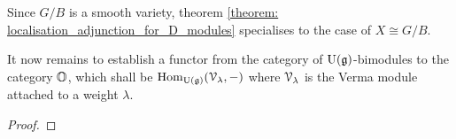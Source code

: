             \begin{corollary}
                Since $G/B$ is a smooth variety, theorem \ref{theorem: localisation_adjunction_for_D_modules} specialises to the case of $X \cong G/B$.
            \end{corollary}
            
            It now remains to establish a functor from the category of $\mathrm{U}(\mathfrak{g})$-bimodules to the category $\mathbb{O}$, which shall be $\mathrm{Hom}_{\mathrm{U}(\mathfrak{g})}(\mathcal{V}_{\lambda}, -)$ where $\mathcal{V}_{\lambda}$ is the Verma module attached to a weight $\lambda$. 
            \begin{theorem} \label{theorem: beilinson_bernstein_localisation}
                
            \end{theorem}
                \begin{proof}
                    
                \end{proof}
            \begin{corollary} \label{coro: borel_weil_bott_theorem}
                
            \end{corollary}
